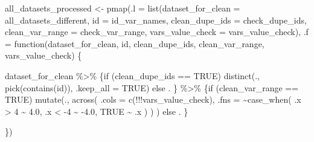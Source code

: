 \documentclass[
  letterpaper,
  DIV=11,
  numbers=noendperiod]{scrreprt}
\newenvironment{Shaded}{\begin{snugshade}}{\end{snugshade}}
\newcommand{\AttributeTok}[1]{\textcolor[rgb]{0.40,0.45,0.13}{#1}}
\newcommand{\ConstantTok}[1]{\textcolor[rgb]{0.56,0.35,0.01}{#1}}
\newcommand{\ControlFlowTok}[1]{\textcolor[rgb]{0.00,0.23,0.31}{#1}}
\newcommand{\DecValTok}[1]{\textcolor[rgb]{0.68,0.00,0.00}{#1}}
\newcommand{\FloatTok}[1]{\textcolor[rgb]{0.68,0.00,0.00}{#1}}
\newcommand{\FunctionTok}[1]{\textcolor[rgb]{0.28,0.35,0.67}{#1}}
\newcommand{\NormalTok}[1]{\textcolor[rgb]{0.00,0.23,0.31}{#1}}
\newcommand{\OtherTok}[1]{\textcolor[rgb]{0.00,0.23,0.31}{#1}}
\newcommand{\SpecialCharTok}[1]{\textcolor[rgb]{0.37,0.37,0.37}{#1}}
\begin{document}
\begin{Shaded}
\begin{Highlighting}[]
\NormalTok{all\_datasets\_processed }\OtherTok{\textless{}{-}} \FunctionTok{pmap}\NormalTok{(}\AttributeTok{.l =} \FunctionTok{list}\NormalTok{(}\AttributeTok{dataset\_for\_clean =}\NormalTok{ all\_datasets\_different, }\AttributeTok{id =}\NormalTok{ id\_var\_names, }
                                    \AttributeTok{clean\_dupe\_ids =}\NormalTok{ check\_dupe\_ids, }\AttributeTok{clean\_var\_range =}\NormalTok{ check\_var\_range,}
                                    \AttributeTok{vars\_value\_check =}\NormalTok{ vars\_value\_check),}
                               \AttributeTok{.f =} \ControlFlowTok{function}\NormalTok{(dataset\_for\_clean,}
\NormalTok{                                             id,}
\NormalTok{                                             clean\_dupe\_ids,}
\NormalTok{                                             clean\_var\_range,}
\NormalTok{                                             vars\_value\_check) \{}
    
\NormalTok{    dataset\_for\_clean }\SpecialCharTok{\%\textgreater{}\%}
\NormalTok{      \{}\ControlFlowTok{if}\NormalTok{ (clean\_dupe\_ids }\SpecialCharTok{==} \ConstantTok{TRUE}\NormalTok{)}
        \FunctionTok{distinct}\NormalTok{(.,}
          \FunctionTok{pick}\NormalTok{(}\FunctionTok{contains}\NormalTok{(id)), }\AttributeTok{.keep\_all =} \ConstantTok{TRUE}\NormalTok{)}
        \ControlFlowTok{else}\NormalTok{ .}
\NormalTok{        \} }\SpecialCharTok{\%\textgreater{}\%}
\NormalTok{      \{}\ControlFlowTok{if}\NormalTok{ (clean\_var\_range }\SpecialCharTok{==} \ConstantTok{TRUE}\NormalTok{)}
        \FunctionTok{mutate}\NormalTok{(.,}
               \FunctionTok{across}\NormalTok{(}
                 \AttributeTok{.cols =} \FunctionTok{c}\NormalTok{(}\SpecialCharTok{!!!}\NormalTok{vars\_value\_check),}
                 \AttributeTok{.fns =} \SpecialCharTok{\textasciitilde{}}\FunctionTok{case\_when}\NormalTok{(}
\NormalTok{                   .x }\SpecialCharTok{\textgreater{}} \DecValTok{4} \SpecialCharTok{\textasciitilde{}} \FloatTok{4.0}\NormalTok{,}
\NormalTok{                   .x }\SpecialCharTok{\textless{}} \SpecialCharTok{{-}}\DecValTok{4} \SpecialCharTok{\textasciitilde{}} \SpecialCharTok{{-}}\FloatTok{4.0}\NormalTok{,}
                   \ConstantTok{TRUE} \SpecialCharTok{\textasciitilde{}}\NormalTok{ .x}
\NormalTok{                 )}
\NormalTok{               )}
\NormalTok{        )}
        \ControlFlowTok{else}\NormalTok{ .}
\NormalTok{        \}}

  
\NormalTok{\})}
\end{Highlighting}
\end{Shaded}
\end{document}
